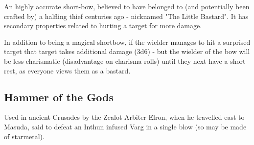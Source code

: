 \noindent 

An highly accurate short-bow, believed to have belonged to (and potentially been crafted by) a halfling thief centuries ago - nicknamed "The Little Bastard". It has secondary properties related to hurting a target for more damage.

In addition to being a magical shortbow, if the wielder manages to hit a surprised target that target takes additional damage (3d6) - but the wielder of the bow will be less charismatic (disadvantage on charisma rolls) until they next have a short rest, as everyone views them as a bastard.

\smallskip

\subsection*{Hammer of the Gods}


\noindent

Used in ancient Crusades by the Zealot Arbiter Elron, when he travelled east to Masuda, said to defeat an Inthun infused Varg in a single blow (so may be made of starmetal).


